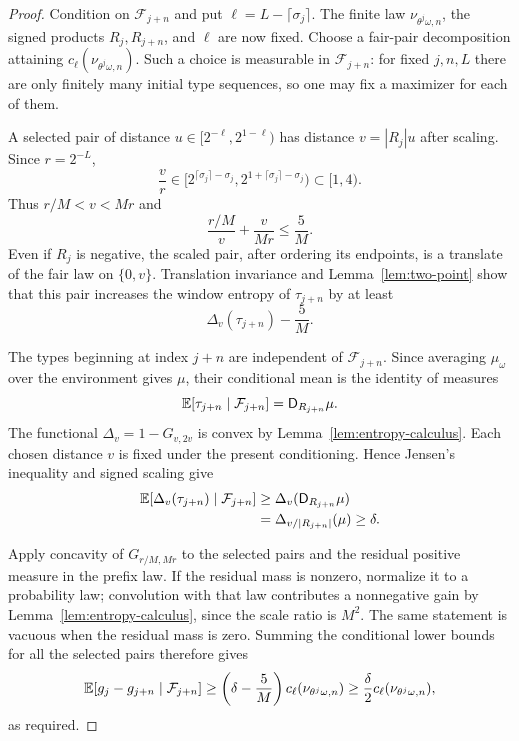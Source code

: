 \begin{proof}
Condition on $\mathcal F_{j+n}$ and put
$\ell=L-\lceil\sigma_j\rceil$.  The finite law
$\nu_{\theta^j\omega,n}$, the signed products $R_j,R_{j+n}$, and
$\ell$ are now fixed.  Choose a fair-pair decomposition attaining
$c_\ell(\nu_{\theta^j\omega,n})$.  Such a choice is measurable in
$\mathcal F_{j+n}$: for fixed $j,n,L$ there are only finitely many
initial type sequences, so one may fix a maximizer for each of them.

A selected pair of distance $u\in[2^{-\ell},2^{1-\ell})$ has distance
$v=|R_j|u$ after scaling.  Since $r=2^{-L}$,
\[
 \frac vr\in
 \bigl[2^{\lceil\sigma_j\rceil-\sigma_j},
       2^{1+\lceil\sigma_j\rceil-\sigma_j}\bigr)
 \subset[1,4).
\]
Thus $r/M<v<Mr$ and
\[
 \frac{r/M}{v}+\frac{v}{Mr}\le\frac5M.
\]
Even if $R_j$ is negative, the scaled pair, after ordering its endpoints,
is a translate of the fair law on $\{0,v\}$.  Translation invariance
and Lemma~\ref{lem:two-point} show that this pair increases the window
entropy of $\tau_{j+n}$ by at least
\[
 \Delta_v(\tau_{j+n})-\frac5M.
\]

The types beginning at index $j+n$ are independent of
$\mathcal F_{j+n}$.  Since averaging $\mu_\omega$ over the environment
gives $\mu$, their conditional mean is the identity of measures
\[
 \mathbb E[\tau_{j+n}\mid\mathcal F_{j+n}]
   =\mathsf D_{R_{j+n}}\mu.
\]
The functional $\Delta_v=1-G_{v,2v}$ is convex by
Lemma~\ref{lem:entropy-calculus}.  Each chosen distance $v$ is fixed
under the present conditioning.  Hence Jensen's inequality and signed
scaling give
\begin{align*}
 \mathbb E[\Delta_v(\tau_{j+n})\mid\mathcal F_{j+n}]
 &\ge\Delta_v(\mathsf D_{R_{j+n}}\mu)\\
 &=\Delta_{v/|R_{j+n}|}(\mu)\ge\delta.
\end{align*}

Apply concavity of $G_{r/M,Mr}$ to the selected pairs and the residual
positive measure in the prefix law.  If the residual mass is nonzero,
normalize it to a probability law; convolution with that law contributes
a nonnegative gain by Lemma~\ref{lem:entropy-calculus}, since the scale
ratio is $M^2$.  The same statement is vacuous when the residual mass is
zero.  Summing the conditional lower bounds for all the selected pairs
therefore gives
\[
 \mathbb E[g_j-g_{j+n}\mid\mathcal F_{j+n}]
 \ge\left(\delta-\frac5M\right)
       c_\ell(\nu_{\theta^j\omega,n})
 \ge\frac\delta2c_\ell(\nu_{\theta^j\omega,n}),
\]
as required.
\end{proof}

